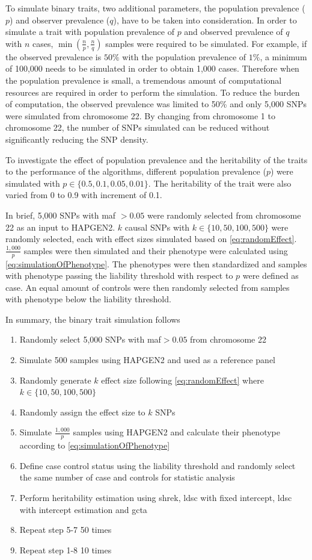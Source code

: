 \documentclass[12pt]{scrbook}
\begin{document}
To simulate binary traits, two additional parameters, the population prevalence ($p$) and observer prevalence ($q$), have to be taken into consideration. 
In order to simulate a trait with population prevalence of $p$ and observed prevalence of $q$ with $n$ cases, $\min(\frac{n}{p}, \frac{n}{q})$ samples were required to be simulated. 
For example, if the observed prevalence is $50\%$ with the population prevalence of $1\%$, a minimum of 100,000 needs to be simulated in order to obtain 1,000 cases.
Therefore when the population prevalence is small, a tremendous amount of computational resources are required in order to perform the simulation.
To reduce the burden of computation, the observed prevalence was limited to 50\% and only 5,000 \glspl{SNP} were simulated from chromosome 22.
By changing from chromosome 1 to chromosome 22, the number of \glspl{SNP} simulated can be reduced without significantly reducing the \gls{SNP} density.

To investigate the effect of population prevalence and the heritability of the traits to the performance of the algorithms, different population prevalence ($p$) were simulated with $p\in\{0.5, 0.1, 0.05, 0.01\}$.
The heritability of the trait were also varied from 0 to 0.9 with increment of 0.1.

In brief, 5,000 \glspl{SNP} with \gls{maf} $>0.05$ were randomly selected from chromosome 22 as an input to HAPGEN2. 
$k$ causal \glspl{SNP} with $k\in\{10,50,100,500\}$ were randomly selected, each with effect sizes simulated based on \cref{eq:randomEffect}.
$\frac{1,000}{p}$ samples were then simulated and their phenotype were calculated using \cref{eq:simulationOfPhenotype}.
The phenotypes were then standardized and samples with phenotype passing the liability threshold with respect to $p$ were defined as case.
An equal amount of controls were then randomly selected from samples with phenotype below the liability threshold.

In summary, the binary trait simulation follows
\begin{enumerate}
	\item Randomly select 5,000 \glspl{SNP} with \gls{maf}$>0.05$ from chromosome 22
	\item Simulate 500 samples using HAPGEN2 and used as a reference panel
	\item Randomly generate $k$ effect size following \cref{eq:randomEffect} where $k\in\{10,50,100,500\}$
	\item Randomly assign the effect size to $k$ \glspl{SNP}
	\item Simulate $\frac{1,000}{p}$ samples using HAPGEN2 and calculate their phenotype according to \cref{eq:simulationOfPhenotype}
	\item Define case control status using the liability threshold and randomly select the same number of case and controls for statistic analysis
	\item Perform heritability estimation using \gls{shrek}, \gls{ldsc} with fixed intercept, \gls{ldsc} with intercept estimation and \gls{gcta}
	\item Repeat step 5-7 50 times
	\item Repeat step 1-8 10 times
\end{enumerate}
\end{document}
